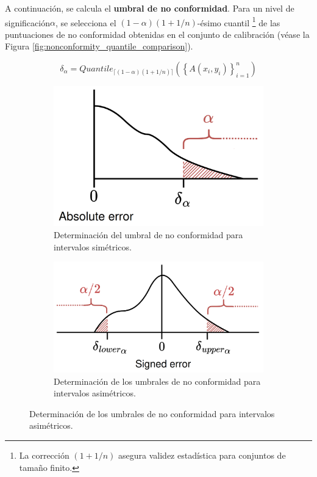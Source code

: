 \begin{enumerate}
    A continuación, se calcula el \textbf{umbral de no conformidad}. Para un nivel de significación$\alpha$, se selecciona el $(1 - \alpha)(1 + 1/n)$-ésimo cuantil%
    \footnote{
        La corrección $(1 + 1/n)$ asegura validez estadística para conjuntos de tamaño finito.
    } 
    de las puntuaciones de no conformidad obtenidas en el conjunto de calibración (véase la Figura \ref{fig:nonconformity_quantile_comparison}).

    $$
    \delta_\alpha = Quantile_{ \lceil  (1-\alpha) (1 + 1/n)  \rceil } ( \left\{ A(x_i,y_i) \right\}_{i=1}^n )
    $$

    \begin{figure}[htbp]
        \centering

        \begin{subfigure}[b]{0.48\textwidth}
            \centering
            \includegraphics[width=\textwidth]{capitulos/cap_02/imagenes/nonconformity_quantile_threshold_simetric.png}
            \caption{Determinación del umbral de no conformidad para intervalos simétricos.}
            \label{fig:nonconformity_quantile_threshold_simetric}
        \end{subfigure}
        \hfill
        \begin{subfigure}[b]{0.49\textwidth}
            \centering
            \includegraphics[width=\textwidth]{capitulos/cap_02/imagenes/nonconformity_quantile_threshold_asimetric.png}
            \caption{Determinación de los umbrales de no conformidad para intervalos asimétricos.}
            \label{fig:nonconformity_quantile_threshold_asimetric}
        \end{subfigure}


\end{figure}
\end{enumerate}
